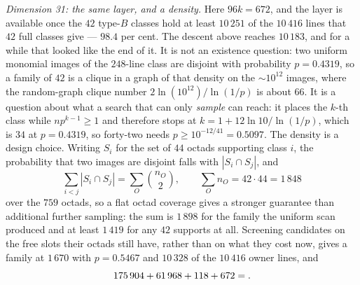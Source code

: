 \documentclass[11pt]{amsart}
\theoremstyle{remark}
\begin{document}
\emph{Dimension 31: the same layer, and a density.} Here $96k=672$, and the
layer is available once the $42$ type-$B$ classes hold at least $10\,251$ of the
$10\,416$ lines that $42$ full classes give --- $98.4$ per cent. The descent
above reaches $10\,183$, and for a while that looked like the end of it. It is
not an existence question: two uniform monomial images of the $248$-line class
are disjoint with probability $p=0.4319$, so a family of $42$ is a clique in a
graph of that density on the $\sim\!10^{12}$ images, where the random-graph
clique number $2\ln(10^{12})/\ln(1/p)$ is about $66$. It is a question about
what a search that can only \emph{sample} can reach: it places the $k$-th class
while $np^{k-1}\ge1$ and therefore stops at $k=1+12\ln10/\ln(1/p)$, which is
$34$ at $p=0.4319$, so forty-two needs $p\ge10^{-12/41}=0.5097$. The density is
a design choice. Writing $S_{i}$ for the set of $44$ octads supporting class
$i$, the probability that two images are disjoint falls with $|S_{i}\cap S_{j}|$,
and
\[
  \sum_{i<j}|S_{i}\cap S_{j}|=\sum_{O}\binom{n_{O}}{2},\qquad
  \sum_{O}n_{O}=42\cdot44=1\,848
\]
over the $759$ octads, so a flat octad coverage gives a stronger guarantee than additional
further sampling: the sum is $1\,898$ for the family the uniform scan produced
and at least $1\,419$ for any $42$ supports at all. Screening candidates on the
free slots their octads still have, rather than on what they cost now, gives a
family at $1\,670$ with $p=0.5467$ and $10\,328$ of the $10\,416$ owner lines,
and
\[
  175\,904+61\,968+118+672=\Kh{31} .
\]
\end{document}
